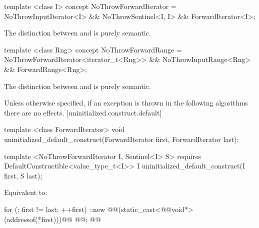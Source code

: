 {\begin{itemdecl}
template <class I>
concept NoThrowForwardIterator =
  NoThrowInputIterator<I> &&
  NoThrowSentinel<I, I> &&
  ForwardIterator<I>;
\end{itemdecl}

\begin{itemdescr}
\pnum
\enternote The distinction between  and
 is purely semantic.\exitnote
\end{itemdescr}

\begin{itemdecl}
template <class Rng>
concept NoThrowForwardRange =
  NoThrowForwardIterator<iterator_t<Rng>> &&
  NoThrowInputRange<Rng> &&
  ForwardRange<Rng>;
\end{itemdecl}

\begin{itemdescr}
\pnum
\enternote The distinction between  and
 is purely semantic.\exitnote
\end{itemdescr}
} %

Unless otherwise specified, if an exception is thrown in the following algorithms there are no effects.
[uninitialized.construct.default]{}
{\color{remclr}
\begin{codeblock}
template <class ForwardIterator>
  void uninitialized_default_construct(ForwardIterator first, ForwardIterator last);
\end{codeblock}
} %

{\color{addclr}
\begin{codeblock}
template <NoThrowForwardIterator I, Sentinel<I> S>
  requires
DefaultConstructible<value_type_t<I>>
  I uninitialized_default_construct(I first, S last);
\end{codeblock}
} %

\setcounter{Paras}{0}
\pnum
\effects Equivalent to:
\begin{codeblock}
    for (; first != last; ++first)
      ::new @@(static_cast<@@void*>(addressof(*first)))@\added{)}@
        @@;
    @@
\end{codeblock}

